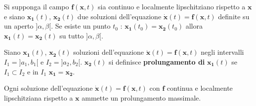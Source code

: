 \documentclass[10pt, oneside]{book}
\theoremstyle{plain}
\begin{document}
\begin{prop}
Si supponga il campo $\mathbf{f}(\mathbf{x}, t)$ sia continuo e localmente lipschitziano rispetto a $\mathbf{x}$ e siano $\mathbf{x_1}(t)$, $\mathbf{x_2}(t)$ due soluzioni dell'equazione $\dot{\mathbf{x}}(t) = \mathbf{f}(\mathbf{x}, t)$ definite su un aperto $]\alpha, \beta[$. Se esiste un punto $t_0$ : $\mathbf{x_1}(t_0) = \mathbf{x_2}(t_0)$ allora $\mathbf{x_1}(t) = \mathbf{x_2}(t)$ su tutto $]\alpha, \beta[$.
\end{prop} 

\begin{defin}
Siano $\mathbf{x_1}(t)$, $\mathbf{x_2}(t)$ soluzioni dell'equazione $\dot{\mathbf{x}}(t) = \mathbf{f}(\mathbf{x}, t)$ negli intervalli $I_1 = ]a_1, b_1[$ e $I_2 = ]a_2, b_2[$. $\mathbf{x_2}(t)$ si definisce \textbf{prolungamento di} $\mathbf{x_1}(t)$ se $I_1 \subset I_2$ e in $I_1$ $\mathbf{x_1} = \mathbf{x_2}$.
\end{defin}

\begin{ther}
Ogni soluzione dell'equazione $\dot{\mathbf{x}}(t) = \mathbf{f}(\mathbf{x}, t)$ con $\mathbf{f}$ continua e localmente lipschitziana rispetto a $\mathbf{x}$ ammette un prolungamento massimale.
\end{ther}
\end{document}
